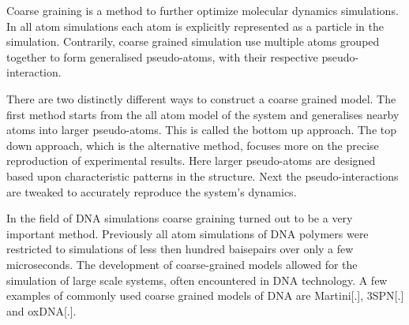 Coarse graining is a method to further optimize molecular dynamics simulations.
In all atom simulations each atom is explicitly represented as a particle in the
simulation. Contrarily, coarse grained simulation use multiple atoms grouped
together to form generalised pseudo-atoms, with their respective pseudo-interaction.

There are two distinctly different ways to construct a coarse grained model. The first
method starts from the all atom model of the system and generalises nearby atoms into
larger pseudo-atoms. This is called the bottom up approach. The top down approach, which
is the alternative method, focuses more on the precise reproduction of experimental
results. Here larger pseudo-atoms are designed based upon characteristic patterns in the
structure. Next the pseudo-interactions are tweaked to accurately reproduce the
system's dynamics.

In the field of DNA simulations coarse graining turned out to be a very important
method. Previously all atom simulations of DNA polymers were restricted to simulations of
less then hundred baisepairs over only a few microseconds. The development of
coarse-grained models allowed for the simulation of large scale systems, often
encountered in DNA technology. A few examples of commonly used coarse grained models of
DNA are Martini[.], 3SPN[.] and oxDNA[.].\\

